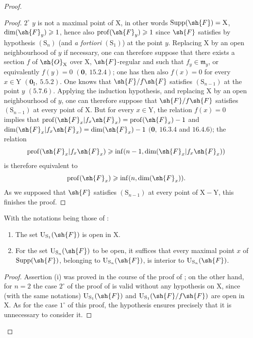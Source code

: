 \begin{proof}
\begin{proof}
$2^\circ$ $y$ is not a maximal point of $\mathrm{X}$, in other words $\operatorname{Supp}(\sh{F})=\mathrm{X}$,
$\dim(\sh{F}_y)\geqslant 1$, hence also $\operatorname{prof}(\sh{F}_y)\geqslant 1$ since $\sh{F}$ satisfies by hypothesis $(\mathrm{S}_n)$ (and \emph{a fortiori} $(\mathrm{S}_1)$)
at the point $y$. Replacing $\mathrm{X}$ by an open neighbourhood of $y$ if necessary, one can therefore suppose
that there exists a section $f$ of $\sh{O}_\mathrm{X}$ over $\mathrm{X}$, $\sh{F}$-regular and such that $f_y\in\mathfrak{m}_y$, or
equivalently $f(y)=0$ $(\mathbf{0},~15.2.4)$; one has then also $f(x)=0$ for every $x\in\mathrm{Y}$ $(\mathbf{0}_\mathrm{I},~5.5.2)$.
One knows that $\sh{F}/f\sh{F}$ satisfies $(\mathrm{S}_{n-1})$ at the point $y$ $(5.7.6)$. Applying the induction hypothesis,
and replacing $\mathrm{X}$ by an open neighbourhood of $y$, one can therefore
suppose that $\sh{F}/f\sh{F}$ satisfies $(\mathrm{S}_{n-1})$ at every point of $\mathrm{X}$. But for every $x\in\mathrm{Y}$, the relation
$f(x)=0$ implies that $\operatorname{prof}(\sh{F}_x|f_x\sh{F}_x)=\operatorname{prof}(\sh{F}_x)-1$ and $\dim(\sh{F}_x|f_x\sh{F}_x)=\dim(\sh{F}_x)-1$
$(\mathbf{0},~16.3.4$ and $16.4.6)$; the relation
\[
  \operatorname{prof}(\sh{F}_x|f_x\sh{F}_x)\geqslant\inf(n-1,\dim(\sh{F}_x|f_x\sh{F}_x))
\]
is therefore equivalent to
\[
  \operatorname{prof}(\sh{F}_x)\geqslant\inf(n,\dim(\sh{F}_x)).
\]
As we supposed that $\sh{F}$ satisfies $(\mathrm{S}_{n-1})$ at every point of $\mathrm{X}-\mathrm{Y}$, this finishes the proof.
\end{proof}

\begin{corollary}[6.11.7]
\label{IV.6.11.7}
With the notations being those of :
\begin{enumerate}[label=(\roman*)]
  \item The set $\mathrm{U}_{\mathrm{S}_1}(\sh{F})$ is open in $\mathrm{X}$.
  \item For the set $\mathrm{U}_{\mathrm{S}_n}(\sh{F})$ to be open, it suffices that every maximal point $x$ of $\operatorname{Supp}(\sh{F})$,
belonging to $\mathrm{U}_{\mathrm{S}_n}(\sh{F})$, is interior to $\mathrm{U}_{\mathrm{S}_n}(\sh{F})$.
\end{enumerate}
\end{corollary}

\begin{proof}
Assertion (i) was proved in the course of the proof of ;
on the other hand, for $n=2$ the case $2^\circ$ of the proof of  is valid without any
hypothesis on $\mathrm{X}$, since (with the same notations) $\mathrm{U}_{\mathrm{S}_1}(\sh{F})$ and $\mathrm{U}_{\mathrm{S}_1}(\sh{F}/f\sh{F})$ are open
in $\mathrm{X}$. As for the case $1^\circ$ of this proof, the hypothesis ensures precisely that it
is unnecessary to consider it.
\end{proof}


\end{proof}
